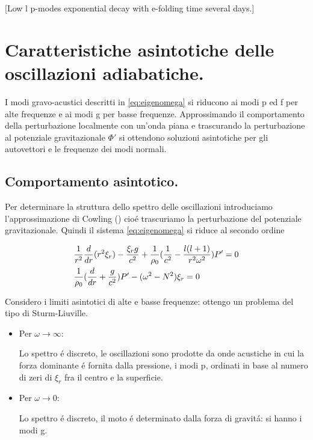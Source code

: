 \documentclass[../main.tex]{subfiles}
\begin{document}
[Low l p-modes exponential decay with e-folding time several days.]


{\let\clearpage\relax           %
\chapter{Caratteristiche asintotiche delle oscillazioni adiabatiche.}\label{chap:asyntoticbehavour}
}


I modi gravo-acustici descritti in \eqref{eq:eigenomega} si riducono ai modi p ed f per alte frequenze e ai modi g per basse frequenze. Approssimando il comportamento della perturbazione localmente con un'onda piana e trascurando la perturbazione al potenziale gravitazionale $\Phi'$ si ottendono soluzioni asintotiche per gli autovettori e le frequenze dei modi normali.

\section{Comportamento asintotico.}

Per determinare la struttura dello spettro delle oscillazioni introduciamo l'approssimazione di Cowling (\cite{cow41oscillations}) cio\'e trascuriamo la perturbazione del potenziale gravitazionale. Quindi il sistema \eqref{eq:eigenomega} si riduce al secondo ordine

\begin{align}
&\frac{1}{r^2}\frac{d}{d r}(r^2\xi_r)-\frac{\xi_rg}{c^2}+\frac{1}{\rho_0}(\frac{1}{c^2}-\frac{l(l+1)}{r^2\omega^2})P'=0\label{eq:cowosc}\\
&\frac{1}{\rho_0}(\frac{d}{d r}+\frac{g}{c^2})P'-(\omega^2-N^2)\xi_r=0\nonumber
\end{align}

Considero i limiti asintotici di alte e basse frequenze: ottengo un problema del tipo di Sturm-Liuville.

\begin{itemize}
\item Per $\omega\to\infty$:

Lo spettro \'e discreto, le oscillazioni sono prodotte da onde acustiche in cui la forza dominante \'e fornita dalla pressione, i modi p, ordinati in base al numero di zeri di $\xi_r$ fra il centro e la superficie.

\item Per $\omega\to0$:

Lo spettro \'e discreto, il moto \'e determinato dalla forza di gravit\'a: si hanno i modi g.

\end{itemize}
\end{document}

